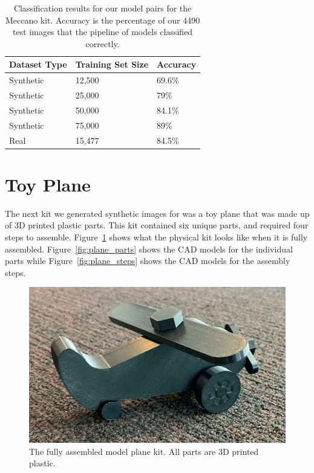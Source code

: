 \begin{table}
\begin{tabular}{|l||l|l|}
\hline
  Dataset Type & Training Set Size & Accuracy\\
  \hline
  \hline
  Synthetic & 12,500 & 69.6\%\\
  Synthetic & 25,000 & 79\%\\
  Synthetic & 50,000 & 84.1\%\\
  Synthetic & 75,000 & 89\%\\
  \hline
  Real & 15,477 & 84.5\%\\
\hline
\end{tabular}
  \caption{
    Classification results for our model pairs for the Meccano kit.
    Accuracy is the percentage of our 4490 test images that the pipeline of
    models classified correctly.
  }\label{tab:meccano_accuracy}
\end{table}

\section{Toy Plane}

The next kit we generated synthetic images for was a toy plane that was made up
of 3D printed plastic parts.
This kit contained six unique parts, and required four steps to assemble.
Figure~\ref{fig:assembled_plane} shows what the physical kit looks like when it
is fully assembled.
Figure~\ref{fig:plane_parts} shows the CAD models for the individual parts while
Figure~\ref{fig:plane_steps} shows the CAD models for the assembly steps.

\begin{figure}
  \includegraphics[width=\columnwidth]{figures/synthetic/toy_plane.jpg}
  \caption{
    The fully assembled model plane kit. All parts are 3D printed plastic.
  }\label{fig:assembled_plane}
\end{figure}

